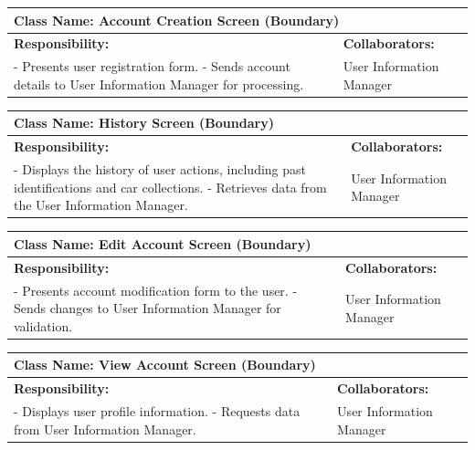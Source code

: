 \documentclass[]{article}
\begin{document}
\begin{table}[ht]
    \centering
    \begin{tabular}{|p{7cm}|p{7cm}|}
    \hline
     \multicolumn{2}{|l|}{\textbf{Class Name: Account Creation Screen (Boundary)}} \\
    \hline
    \textbf{Responsibility:} & \textbf{Collaborators:} \\
    \hline
    - Presents user registration form. \newline
    - Sends account details to User Information Manager for processing.
    &
    User Information Manager \\
    \hline
    \end{tabular}
\end{table}

\begin{table}[ht]
    \centering
    \begin{tabular}{|p{7cm}|p{7cm}|}
    \hline
     \multicolumn{2}{|l|}{\textbf{Class Name: History Screen (Boundary)}} \\
    \hline
    \textbf{Responsibility:} & \textbf{Collaborators:} \\
    \hline
    - Displays the history of user actions, including past identifications and car collections. \newline
    - Retrieves data from the User Information Manager.
    &
    User Information Manager \\
    \hline
    \end{tabular}
\end{table}

\begin{table}[ht]
    \centering
    \begin{tabular}{|p{7cm}|p{7cm}|}
    \hline
     \multicolumn{2}{|l|}{\textbf{Class Name: Edit Account Screen (Boundary)}} \\
    \hline
    \textbf{Responsibility:} & \textbf{Collaborators:} \\
    \hline
    - Presents account modification form to the user. \newline
    - Sends changes to User Information Manager for validation.
    &
    User Information Manager \\
    \hline
    \end{tabular}
\end{table}

\begin{table}[ht]
    \centering
    \begin{tabular}{|p{7cm}|p{7cm}|}
    \hline
     \multicolumn{2}{|l|}{\textbf{Class Name: View Account Screen (Boundary)}} \\
    \hline
    \textbf{Responsibility:} & \textbf{Collaborators:} \\
    \hline
    - Displays user profile information. \newline
    - Requests data from User Information Manager.
    &
    User Information Manager\\
    \hline
    \end{tabular}
\end{table}
\end{document}
